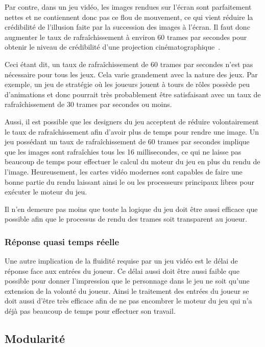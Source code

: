 \documentclass[12pt,oneside,letterpaper,francais]{book}
\begin{document}
Par contre, dans un jeu vidéo, les images rendues sur l'écran sont
parfaitement nettes et ne contiennent donc pas ce flou de mouvement,
ce qui vient réduire la crédibilité de l'illusion faite par la
succession des images à l'écran. Il faut donc augmenter le taux de
rafraîchissement à environ 60 trames par secondes pour obtenir le
niveau de crédibilité d'une projection
cinématographique~\cite{30vs60}.

Ceci étant dit, un taux de rafraîchissement de 60 trames par secondes
n'est pas nécessaire pour tous les jeux. Cela varie grandement avec la
nature des jeux. Par exemple, un jeu de stratégie où les joueurs
jouent à tours de rôles possède peu d'animations et donc pourrait très
probablement être satisfaisant avec un taux de rafraîchissement de 30
trames par secondes ou moins.

Aussi, il est possible que les designers du jeu acceptent de réduire
volontairement le taux de rafraîchissement afin d'avoir plus de temps
pour rendre une image. Un jeu possédant un taux de rafraîchissement de
60 trames par secondes implique que les images sont rafraîchies tous
les 16 millisecondes, ce qui ne laisse pas beaucoup de temps pour
effectuer le calcul du moteur du jeu en plus du rendu de
l'image. Heureusement, les cartes vidéo modernes sont capables de
faire une bonne partie du rendu laissant ainsi le ou les processeurs
principaux libres pour exécuter le moteur du jeu.

Il n'en demeure pas moins que toute la logique du jeu doit être aussi
efficace que possible afin que le processus de rendu des trames soit
transparent au joueur.

\subsubsection{Réponse quasi temps réelle}

Une autre implication de la fluidité requise par un jeu vidéo est le
délai de réponse face aux entrées du joueur. Ce délai aussi doit être
aussi faible que possible pour donner l'impression que le personnage
dans le jeu ne soit qu'une extension de la volonté du joueur. Ainsi le
traitement des entrées du joueur se doit aussi d'être très efficace
afin de ne pas encombrer le moteur du jeu qui n'a déjà pas beaucoup de
temps pour effectuer son travail.

\subsection{Modularité}
\end{document}
